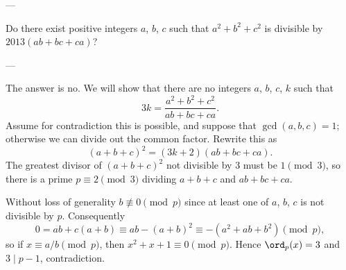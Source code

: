 
---

Do there exist positive integers $a$, $b$, $c$ such that $a^2+b^2+c^2$ is divisible by $2013(ab+bc+ca)$?

---

The answer is no. We will show that there are no integers $a$, $b$, $c$, $k$ such that \[3k=\frac{a^2+b^2+c^2}{ab+bc+ca}.\]
Assume for contradiction this is possible, and suppose that $\gcd(a,b,c)=1$; otherwise we can divide out the common factor. Rewrite this as \[(a+b+c)^2=(3k+2)(ab+bc+ca).\]
The greatest divisor of $(a+b+c)^2$ not divisible by $3$ must be $1\pmod3$, so there is a prime $p\equiv2\pmod3$ dividing $a+b+c$ and $ab+bc+ca$.

Without loss of generality $b\not\equiv0\pmod p$ since at least one of $a$, $b$, $c$ is not divisible by $p$. Consequently \[0=ab+c(a+b)\equiv ab-(a+b)^2\equiv-\left(a^2+ab+b^2\right)\pmod p,\]
so if $x\equiv a/b\pmod p$, then $x^2+x+1\equiv0\pmod p$. Hence $\ord_p(x)=3$ and $3\mid p-1$, contradiction.

